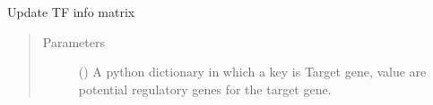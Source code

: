 \documentclass[letterpaper,10pt,english]{sphinxmanual}
\begin{document}
\begin{fulllineitems}
\begin{fulllineitems}
\begin{quote}
\begin{description}
\end{description}\end{quote}

\end{fulllineitems}


\begin{fulllineitems}
\label{\detokenize{modules/celloracle:celloracle.Net.updateTFinfo_dictionary}}
Update TF info matrix
\begin{quote}\begin{description}
\item[{Parameters}] \leavevmode
{} () \textendash{} A python dictionary in which a key is Target gene, value are potential regulatory genes for the target gene.

\end{description}\end{quote}

\end{fulllineitems}


\end{fulllineitems}

\end{document}
